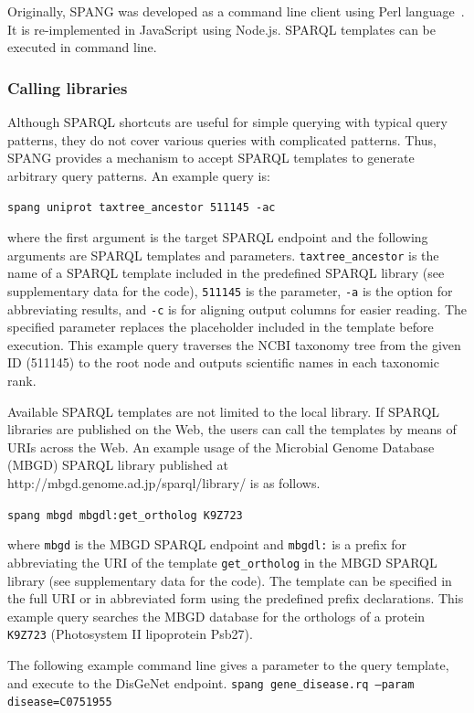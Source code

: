 \documentclass[runningheads]{llncs}
\begin{document}
Originally, SPANG was developed as a command line client using Perl language~\cite{spang}.
It is re-implemented in JavaScript using Node.js.
SPARQL templates can be executed in command line.


\subsubsection{Calling libraries}

Although SPARQL shortcuts are useful for simple querying with typical query patterns, they do not cover various
queries with complicated patterns. 
Thus, SPANG provides a mechanism to accept SPARQL templates to generate arbitrary query patterns. 
An example query is: 

\texttt{spang uniprot taxtree\_ancestor 511145 -ac}

\noindent where the first argument is the target SPARQL endpoint and the following arguments are SPARQL templates and parameters. {\tt taxtree\_ancestor} is the name of a SPARQL template included in the predefined SPARQL library (see supplementary data for the code), {\tt 511145} is the parameter, {\tt -a} is the option for abbreviating results, and {\tt -c} is for aligning output columns for easier reading.
The specified parameter replaces the placeholder included in the template before execution. 
This example query traverses the NCBI taxonomy tree from the given ID (511145) to the root node and outputs scientific names in each taxonomic rank.


Available SPARQL templates are not limited to the local library.
If SPARQL libraries are published on the Web, the users can call the templates by means of URIs across the Web.
An example usage of the Microbial Genome Database (MBGD) SPARQL library published at http://mbgd.genome.ad.jp/sparql/library/ is as follows.

\texttt{spang mbgd mbgdl:get\_ortholog K9Z723}

where {\tt mbgd} is the MBGD SPARQL endpoint \citep{Chiba} and \texttt{mbgdl:} is a prefix for abbreviating the URI of the template {\tt get\_ortholog} in the MBGD SPARQL library (see supplementary data for the code). 
The template can be specified in the full URI or in abbreviated form using the predefined prefix declarations.
This example query searches the MBGD database \citep{Uchiyama} for the orthologs of a protein \texttt{K9Z723} (Photosystem II lipoprotein Psb27).

The following example command line gives a parameter to the query template, and execute to the DisGeNet endpoint.
\texttt{spang gene\_disease.rq --param disease=C0751955}
\end{document}
